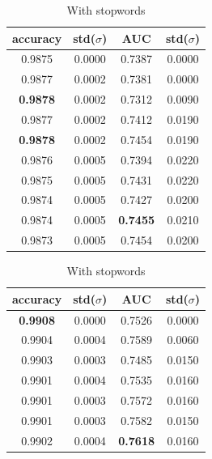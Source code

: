 \begin{table}
  \begin{subtable}{.5\linewidth}
    \centering
    \begin{tabular}{cccc} \toprule
      accuracy        & std($\sigma$) & AUC             & std($\sigma$) \\ \midrule
      0.9875          & 0.0000        & 0.7387          & 0.0000 \\
      0.9877          & 0.0002        & 0.7381          & 0.0000 \\
      \textbf{0.9878} & 0.0002        & 0.7312          & 0.0090 \\
      0.9877          & 0.0002        & 0.7412          & 0.0190 \\
      \textbf{0.9878} & 0.0002        & 0.7454          & 0.0190 \\ \midrule
      0.9876          & 0.0005        & 0.7394          & 0.0220 \\
      0.9875          & 0.0005        & 0.7431          & 0.0220 \\
      0.9874          & 0.0005        & 0.7427          & 0.0200 \\
      0.9874          & 0.0005        & \textbf{0.7455} & 0.0210 \\
      0.9873          & 0.0005        & 0.7454          & 0.0200 \\ \bottomrule
    \end{tabular}
      \caption{With stopwords}
      \label{tab:data_with_stopwords}
  \end{subtable}
  \begin{subtable}{.5\linewidth}
    \centering
    \begin{tabular}{cccc} \toprule
      accuracy        & std($\sigma$) & AUC             & std($\sigma$) \\ \midrule
      \textbf{0.9908} & 0.0000        & 0.7526          & 0.0000 \\
      0.9904          & 0.0004        & 0.7589          & 0.0060 \\
      0.9903          & 0.0003        & 0.7485          & 0.0150 \\
      0.9901          & 0.0004        & 0.7535          & 0.0160 \\
      0.9901          & 0.0003        & 0.7572          & 0.0160 \\ \midrule
      0.9901          & 0.0003        & 0.7582          & 0.0150 \\
      0.9902          & 0.0004        & \textbf{0.7618} & 0.0160 \\

\end{tabular}
\end{subtable}
\end{table}
